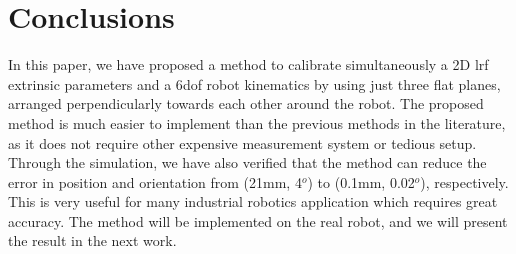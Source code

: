 \section{Conclusions}
\label{sec:conclusions}

In this paper, we have proposed a method to calibrate simultaneously a 2D \ac{lrf} extrinsic parameters and a 6\ac{dof} robot kinematics by using just three flat planes, arranged perpendicularly towards each other around the robot. The proposed method is much easier to implement than the previous methods in the literature, as it does not require other expensive measurement system or tedious setup. Through the simulation, we have also verified that the method can reduce the error in position and orientation from (21mm, 4$^o$) to (0.1mm, 0.02$^o$), respectively. This is very useful for many industrial robotics application which requires great accuracy. The method will be implemented on the real robot, and we will present the result in the next work. 

